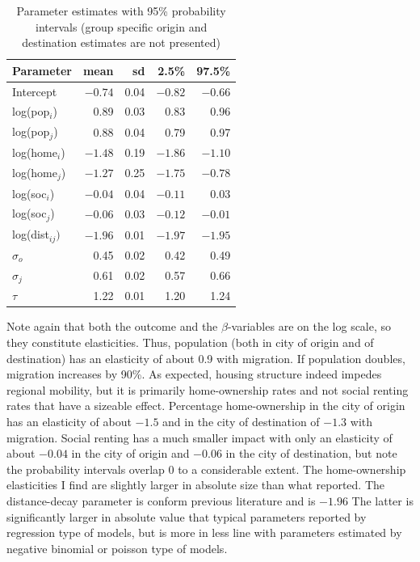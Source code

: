 \documentclass[fleqn,10pt]{SelfArx} %
\begin{document}
{{%
\begin{table}[ht]
  \centering
  \caption{Parameter estimates with 95\% probability intervals (group specific origin and destination estimates are not presented)}
  \label{tab:coef}
  \begin{tabular}{lrrrr}
    \toprule
    Parameter & mean & sd & 2.5\% & 97.5\% \\ 
    \midrule
    Intercept      & $-0.74$ & 0.04 & $-0.82$ & $-0.66$ \\ 
    log(pop$_i$)   & 0.89 & 0.03 & 0.83 & 0.96 \\ 
    log(pop$_j$)   & 0.88 & 0.04 & 0.79 & 0.97 \\ 
    log(home$_i$)  & $-1.48$ & 0.19 & $-1.86$ & $-1.10$ \\ 
    log(home$_j$)  & $-1.27$ & 0.25 & $-1.75$ & $-0.78$ \\ 
    log(soc$_i$)   & $-0.04$ & 0.04 & $-0.11$ & 0.03 \\
    log(soc$_j$)   & $-0.06$ & 0.03 & $-0.12$ & $-0.01$ \\ 
    log(dist$_{ij})$ & $-1.96$ & 0.01 & $-1.97$ & $-1.95$ \\ 
    $\sigma_o$    & 0.45 & 0.02 & 0.42 & 0.49 \\ 
    $\sigma_j$    & 0.61 & 0.02 & 0.57 & 0.66 \\ 
    $\tau$        & 1.22 & 0.01 & 1.20 & 1.24 \\ 
    \bottomrule
  \end{tabular}
\end{table}
\noindent Note again that both the outcome and the $\beta$-variables are on the log scale, so they constitute elasticities.
Thus, population (both in city of origin and of destination) has an elasticity of about 0.9 with migration. If population doubles, migration increases by 90\%. 
As expected, housing structure indeed impedes regional mobility, but it is primarily 
home-ownership rates and not social renting rates that have a sizeable
effect. Percentage home-ownership in the city of origin has an elasticity of about $-1.5$ and in the city of destination of $-1.3$ with migration. Social renting has a much smaller impact with only an elasticity of about $-0.04$ in the city of origin and $-0.06$ in the city of destination, but note the probability intervals overlap 0 to a considerable extent. The home-ownership elasticities I find are slightly larger in absolute
size than what \citet{amirault2016drags} reported. The distance-decay parameter is conform previous literature and is $-1.96$ The latter is significantly larger in absolute value that typical parameters reported by regression type of models, but is more in less line with parameters estimated by negative binomial or poisson type of models. 

}}
\end{document}
